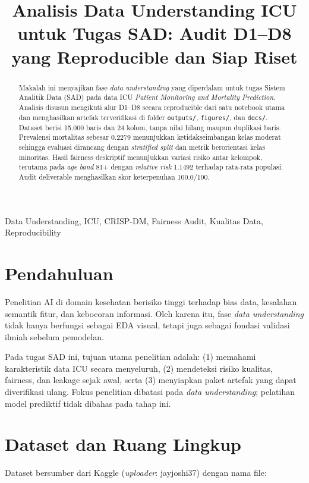 \documentclass[conference]{IEEEtran}
\title{Analisis Data Understanding ICU untuk Tugas SAD: Audit D1--D8 yang Reproducible dan Siap Riset}
\author{\IEEEauthorblockN{Hamzah Arman Husni}
\IEEEauthorblockA{Magister Kecerdasan Artifisial\\
Universitas Gadjah Mada\\
Yogyakarta, Indonesia}}
\begin{document}
\maketitle

\begin{abstract}
Makalah ini menyajikan fase \textit{data understanding} yang diperdalam untuk tugas Sistem Analitik Data (SAD) pada data ICU \textit{Patient Monitoring and Mortality Prediction}. Analisis disusun mengikuti alur D1--D8 secara reproducible dari satu notebook utama dan menghasilkan artefak terverifikasi di folder \texttt{outputs/}, \texttt{figures/}, dan \texttt{docs/}. Dataset berisi 15.000 baris dan 24 kolom, tanpa nilai hilang maupun duplikasi baris. Prevalensi mortalitas sebesar 0.2279 menunjukkan ketidakseimbangan kelas moderat sehingga evaluasi dirancang dengan \textit{stratified split} dan metrik berorientasi kelas minoritas. Hasil fairness deskriptif menunjukkan variasi risiko antar kelompok, terutama pada \textit{age band} 81+ dengan \textit{relative risk} 1.1492 terhadap rata-rata populasi. Audit deliverable menghasilkan skor keterpenuhan 100.0/100.
\end{abstract}

\begin{IEEEkeywords}
Data Understanding, ICU, CRISP-DM, Fairness Audit, Kualitas Data, Reproducibility
\end{IEEEkeywords}

\section{Pendahuluan}
Penelitian AI di domain kesehatan berisiko tinggi terhadap bias data, kesalahan semantik fitur, dan kebocoran informasi. Oleh karena itu, fase \textit{data understanding} tidak hanya berfungsi sebagai EDA visual, tetapi juga sebagai fondasi validasi ilmiah sebelum pemodelan.

Pada tugas SAD ini, tujuan utama penelitian adalah: (1) memahami karakteristik data ICU secara menyeluruh, (2) mendeteksi risiko kualitas, fairness, dan leakage sejak awal, serta (3) menyiapkan paket artefak yang dapat diverifikasi ulang. Fokus penelitian dibatasi pada \textit{data understanding}; pelatihan model prediktif tidak dibahas pada tahap ini.

\section{Dataset dan Ruang Lingkup}
Dataset bersumber dari Kaggle (\textit{uploader}: jayjoshi37) dengan nama file:
\end{document}
